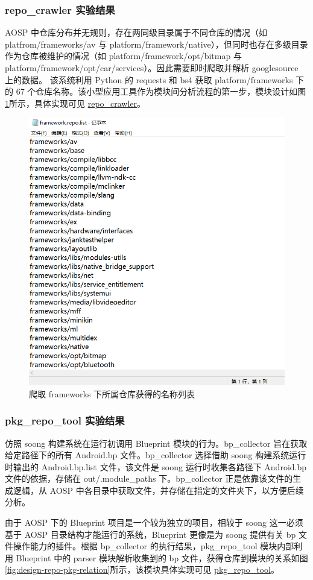 \subsubsection{repo\_crawler 实验结果}

AOSP 中仓库分布并无规则，存在两同级目录属于不同仓库的情况（如 platfrom/frameworks/av 与 platform/framework/native），但同时也存在多级目录作为仓库被维护的情况（如 platform/framework/opt/bitmap 与 platform/framework/opt/car/services）。因此需要即时爬取并解析 googlesource 上的数据。 该系统利用 Python 的 requests 和 bs4 获取 platform/frameworks 下的 67 个仓库名称。该小型应用工具作为模块间分析流程的第一步，模块设计如图\ref{fig:design-repo-list}所示，具体实现可见 \href{https://github.com/AOSPworking/repo_crawler}{repo\_crawler}。

\begin{figure}
    \centering
    \includegraphics[width=.4\textwidth]{figures/design-repo-list.png}
    \caption{爬取 frameworks 下所属仓库获得的名称列表}
    \label{fig:design-repo-list}
\end{figure}

\subsubsection{pkg\_repo\_tool 实验结果}

仿照 soong 构建系统在运行初调用 Blueprint 模块的行为。bp\_collector 旨在获取给定路径下的所有 Android.bp 文件。bp\_collector 选择借助 soong 构建系统运行时输出的 Android.bp.list 文件，该文件是 soong 运行时收集各路径下 Android.bp 文件的依据，存储在 out/.module\_paths 下。bp\_collector 正是依靠该文件的生成逻辑，从 AOSP 中各目录中获取文件，并存储在指定的文件夹下，以方便后续分析。

由于 AOSP 下的 Blueprint 项目是一个较为独立的项目，相较于 soong 这一必须基于 AOSP 目录结构才能运行的系统，Blueprint 更像是为 soong 提供有关 bp 文件操作能力的插件。根据 bp\_collector 的执行结果，pkg\_repo\_tool 模块内部利用 Blueprint 中的 parser 模块解析收集到的 bp 文件，获得仓库到模块的关系如图\ref{fig:design-repo-pkg-relation}所示，该模块具体实现可见 \href{https://github.com/AOSPworking/pkg_repo_tool}{pkg\_repo\_tool}。


